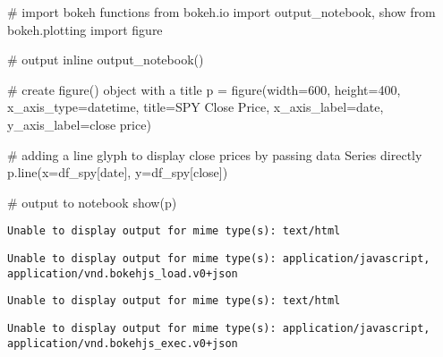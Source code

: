 \documentclass[
  letterpaper,
  DIV=11,
  numbers=noendperiod]{scrreprt}
\newenvironment{Shaded}{\begin{snugshade}}{\end{snugshade}}
\newcommand{\CommentTok}[1]{\textcolor[rgb]{0.37,0.37,0.37}{#1}}
\newcommand{\DecValTok}[1]{\textcolor[rgb]{0.68,0.00,0.00}{#1}}
\newcommand{\ImportTok}[1]{\textcolor[rgb]{0.00,0.46,0.62}{#1}}
\newcommand{\NormalTok}[1]{\textcolor[rgb]{0.00,0.23,0.31}{#1}}
\newcommand{\OperatorTok}[1]{\textcolor[rgb]{0.37,0.37,0.37}{#1}}
\newcommand{\StringTok}[1]{\textcolor[rgb]{0.13,0.47,0.30}{#1}}
\begin{document}
\begin{Shaded}
\begin{Highlighting}[]
\CommentTok{\# import bokeh functions}
\ImportTok{from}\NormalTok{ bokeh.io }\ImportTok{import}\NormalTok{ output\_notebook, show}
\ImportTok{from}\NormalTok{ bokeh.plotting }\ImportTok{import}\NormalTok{ figure}

\CommentTok{\# output inline}
\NormalTok{output\_notebook()}

\CommentTok{\# create figure() object with a title}
\NormalTok{p }\OperatorTok{=}\NormalTok{ figure(width}\OperatorTok{=}\DecValTok{600}\NormalTok{, height}\OperatorTok{=}\DecValTok{400}\NormalTok{, x\_axis\_type}\OperatorTok{=}\StringTok{\textquotesingle{}datetime\textquotesingle{}}\NormalTok{, title}\OperatorTok{=}\StringTok{\textquotesingle{}SPY Close Price\textquotesingle{}}\NormalTok{,}
\NormalTok{           x\_axis\_label}\OperatorTok{=}\StringTok{\textquotesingle{}date\textquotesingle{}}\NormalTok{, y\_axis\_label}\OperatorTok{=}\StringTok{\textquotesingle{}close price\textquotesingle{}}\NormalTok{)}

\CommentTok{\# adding a line glyph to display close prices by passing data Series directly}
\NormalTok{p.line(x}\OperatorTok{=}\NormalTok{df\_spy[}\StringTok{\textquotesingle{}date\textquotesingle{}}\NormalTok{], y}\OperatorTok{=}\NormalTok{df\_spy[}\StringTok{\textquotesingle{}close\textquotesingle{}}\NormalTok{])}

\CommentTok{\# output to notebook}
\NormalTok{show(p)}
\end{Highlighting}
\end{Shaded}

\begin{verbatim}
Unable to display output for mime type(s): text/html
\end{verbatim}

\begin{verbatim}
Unable to display output for mime type(s): application/javascript, application/vnd.bokehjs_load.v0+json
\end{verbatim}

\begin{verbatim}
Unable to display output for mime type(s): text/html
\end{verbatim}

\begin{verbatim}
Unable to display output for mime type(s): application/javascript, application/vnd.bokehjs_exec.v0+json
\end{verbatim}
\end{document}

